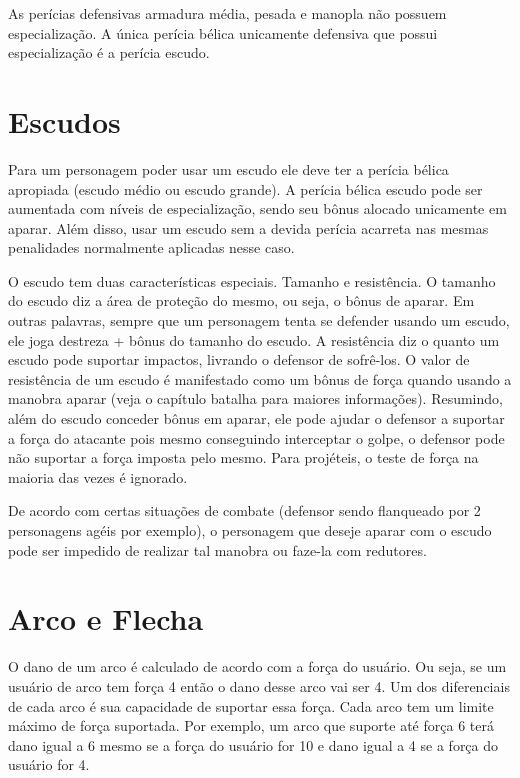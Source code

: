 As perícias defensivas armadura média, pesada e manopla não possuem especialização. A única perícia bélica unicamente defensiva que possui especialização é a perícia escudo.


\section{Escudos}

Para um personagem poder usar um escudo ele deve ter a perícia bélica apropiada (escudo médio ou escudo grande). A perícia bélica escudo pode ser aumentada com níveis de especialização, sendo seu bônus alocado unicamente em aparar. Além disso, usar um escudo sem a devida perícia acarreta nas mesmas penalidades normalmente aplicadas nesse caso.

O escudo tem duas características especiais. Tamanho e resistência. O tamanho do escudo diz a área de proteção do mesmo, ou seja, o bônus de aparar. Em outras palavras, sempre que um personagem tenta se defender usando um escudo, ele joga destreza + bônus do tamanho do escudo. A resistência diz o quanto um escudo pode suportar impactos, livrando o defensor de sofrê-los. O valor de resistência de um escudo é manifestado como um bônus de força quando usando a manobra aparar (veja o capítulo batalha para maiores informações). Resumindo, além do escudo conceder bônus em aparar, ele pode ajudar o defensor a suportar a força do atacante pois mesmo conseguindo interceptar o golpe, o defensor pode não suportar a força imposta pelo mesmo. Para projéteis, o teste de força na maioria das vezes é ignorado. 

De acordo com certas situações de combate (defensor sendo flanqueado por 2 personagens agéis por exemplo), o personagem que deseje aparar com o escudo pode ser impedido de realizar tal manobra ou faze-la com redutores.


\section{Arco e Flecha}

O dano de um arco é calculado de acordo com a força do usuário. Ou seja, se um usuário de arco tem força 4 então o dano desse arco vai ser 4. Um dos diferenciais de cada arco é sua capacidade de suportar essa força. Cada arco tem um limite máximo de força suportada. Por exemplo, um arco que suporte até força 6 terá dano igual a 6 mesmo se a força do usuário for 10 e dano igual a 4 se a força do usuário for 4. 

